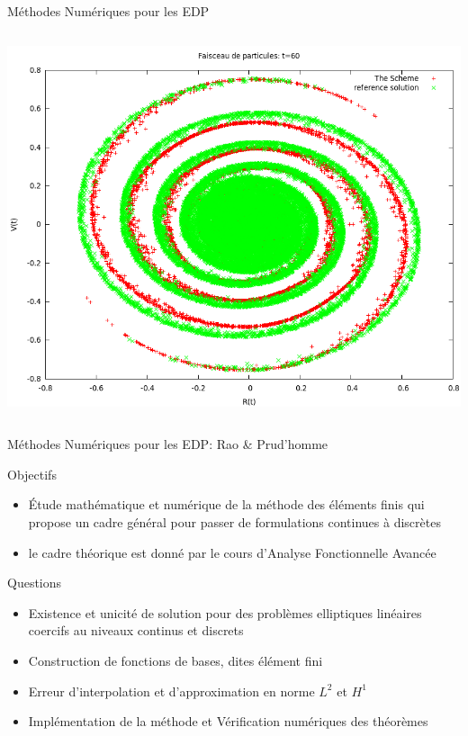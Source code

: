 \documentclass{beamer}
\begin{document}
\begin{frame}{M{\'e}thodes Num{\'e}riques pour les EDP}
\begin{columns}
    \centerline{\includegraphics[width=.9\linewidth]{hirstoaga.png}}
  \end{columns}




\end{frame}
\begin{frame}{Méthodes Numériques pour les EDP: Rao \& Prud'homme}
  \begin{block}{Objectifs}
    \begin{itemize}
    \item {\'E}tude math{\'e}matique et num{\'e}rique de la m{\'e}thode des {\'e}l{\'e}ments
      finis qui propose un cadre g{\'e}n{\'e}ral pour passer de formulations
      continues {\`a} discr{\`e}tes
    \item le cadre th{\'e}orique est donn{\'e} par le cours d'Analyse
      Fonctionnelle Avanc{\'e}e
    \end{itemize}
  \end{block}
  \begin{block}{Questions}
    \begin{itemize}
    \item Existence et unicit{\'e} de solution pour des probl{\`e}mes
      elliptiques lin{\'e}aires coercifs au niveaux continus et discrets
    \item Construction de fonctions de bases, dites {\'e}l{\'e}ment fini
    \item Erreur d'interpolation et d'approximation en norme $L^2$ et $H^1$
    \item Impl{\'e}mentation de la m{\'e}thode et V{\'e}rification num{\'e}riques des th{\'e}or{\`e}mes
    \end{itemize}
  \end{block}
\end{frame}
\end{document}

